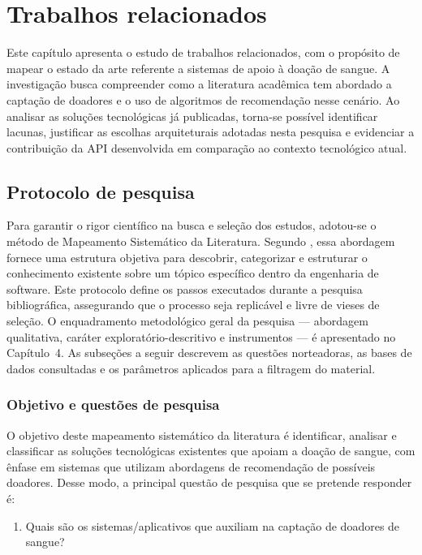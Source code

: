 \chapter{Trabalhos relacionados}

Este capítulo apresenta o estudo de trabalhos relacionados, com o propósito de mapear o estado da arte referente a sistemas de apoio à doação de sangue. A investigação busca compreender como a literatura acadêmica tem abordado a captação de doadores e o uso de algoritmos de recomendação nesse cenário. Ao analisar as soluções tecnológicas já publicadas, torna-se possível identificar lacunas, justificar as escolhas arquiteturais adotadas nesta pesquisa e evidenciar a contribuição da API desenvolvida em comparação ao contexto tecnológico atual.

\section{Protocolo de pesquisa}

Para garantir o rigor científico na busca e seleção dos estudos, adotou-se o método de Mapeamento Sistemático da Literatura. Segundo , essa abordagem fornece uma estrutura objetiva para descobrir, categorizar e estruturar o conhecimento existente sobre um tópico específico dentro da engenharia de software. Este protocolo define os passos executados durante a pesquisa bibliográfica, assegurando que o processo seja replicável e livre de vieses de seleção. O enquadramento metodológico geral da pesquisa --- abordagem qualitativa, caráter exploratório-descritivo e instrumentos --- é apresentado no Capítulo~4. As subseções a seguir descrevem as questões norteadoras, as bases de dados consultadas e os parâmetros aplicados para a filtragem do material.

\subsection{Objetivo e questões de pesquisa}

O objetivo deste mapeamento sistemático da literatura é identificar, analisar e classificar as soluções tecnológicas existentes que apoiam a doação de sangue, com ênfase em sistemas que utilizam abordagens de recomendação de possíveis doadores. Desse modo, a principal questão de pesquisa que se pretende responder é:

\begin{enumerate}[leftmargin=*]
  \item Quais são os sistemas/aplicativos que auxiliam na captação de doadores de sangue?
\end{enumerate}

